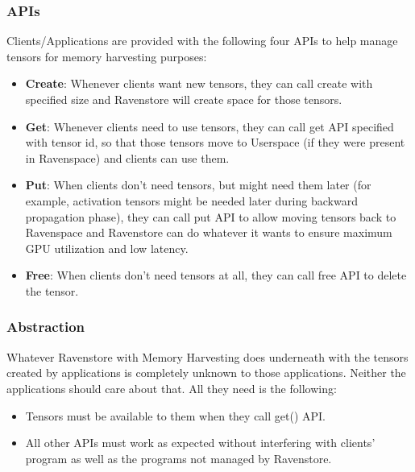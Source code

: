 \documentclass{article}
\begin{document}
	\subsubsection{APIs}Clients/Applications are provided with the following four APIs to help manage tensors for memory harvesting purposes:
	\begin{itemize}
		\item \textbf{Create}: Whenever clients want new tensors, they can call create with specified size and Ravenstore will
		create space for those tensors.
		\item \textbf{Get}: Whenever clients need to use tensors, they can call get API specified with tensor id, so that those tensors
		move to Userspace (if they were present in Ravenspace) and clients can use them.
		\item \textbf{Put}: When clients don't need tensors, but might need them later (for example, activation tensors might be needed later during backward propagation phase),
		they can call put API to allow moving tensors back to Ravenspace and Ravenstore can do whatever it wants to ensure maximum GPU utilization and low latency.
		\item \textbf{Free}: When clients don't need tensors at all, they can call free API to delete the tensor.
	\end{itemize}
	\subsubsection{Abstraction}Whatever Ravenstore with Memory Harvesting does underneath with the tensors created by applications is completely
	unknown to those applications. Neither the applications should care about that. All they need is the following:
	\begin{itemize}
		\item Tensors must be available to them when they call get() API.
		\item All other APIs must work as expected without interfering with clients' program as well as the programs not managed by Ravenstore.
	\end{itemize}
\end{document}

